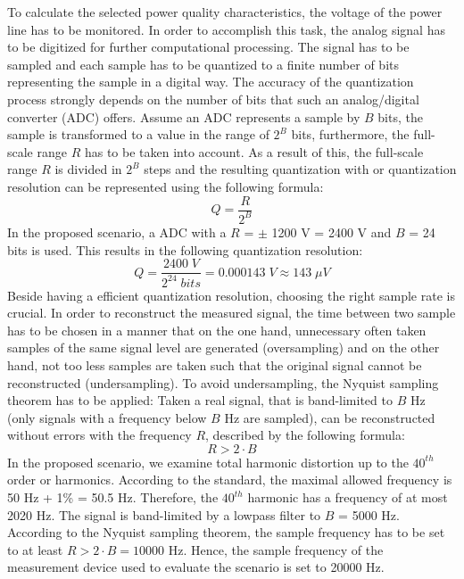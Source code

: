 To calculate the selected power quality characteristics, the voltage of the power line has to be monitored. In order to accomplish this task, the analog signal has to be digitized for further computational processing. The signal has to be sampled and each sample has to be quantized to a finite number of bits representing the sample in a digital way. The accuracy of the quantization process strongly depends on the number of bits that such an analog/digital converter (ADC) offers. Assume an ADC represents a sample by $B$ bits, the sample is transformed to a value in the range of $2^B$ bits, furthermore, the full-scale range $R$ has to be taken into account. As a result of this, the full-scale range $R$ is divided in $2^B$ steps and the resulting quantization with or quantization resolution can be represented using the following formula\cite{sig_proc}:
\[ Q = \frac{R}{2^B} \]
\newline
In the proposed scenario, a ADC with a $R$ = $\pm$ 1200 V = 2400 V and $B$ = 24 bits is used. This results in the following quantization resolution:
\[ Q = \frac{2400 \; V}{2^{24} \; bits} = 0.000143 \; V \approx 143 \; \mu V \]
\newline
Beside having a efficient quantization resolution, choosing the right sample rate is crucial. In order to reconstruct the measured signal, the time between two sample has to be chosen in a manner that on the one hand, unnecessary often taken samples of the same signal level are generated (oversampling) and on the other hand, not too less samples are taken such that the original signal cannot be reconstructed (undersampling)\cite{sig_proc}. To avoid undersampling, the Nyquist sampling theorem has to be applied: Taken a real signal, that is band-limited to $B$ Hz (only signals with a frequency below $B$ Hz are sampled), can be reconstructed without errors with the frequency $R$, described by the following formula\cite{sampling}:
\[R > 2 \cdot B\]
\newline
In the proposed scenario, we examine total harmonic distortion up to the $40^{th}$ order or harmonics. According to the standard, the maximal allowed frequency is 50 Hz + 1\% = 50.5 Hz. Therefore, the $40^{th}$ harmonic has a frequency of at most 2020 Hz. The signal is band-limited by a lowpass filter to $B$ = 5000 Hz. According to the Nyquist sampling theorem, the sample frequency has to be set to at least $R > 2 \cdot B = 10000$ Hz. Hence, the sample frequency of the measurement device used to evaluate the scenario is set to 20000 Hz.

